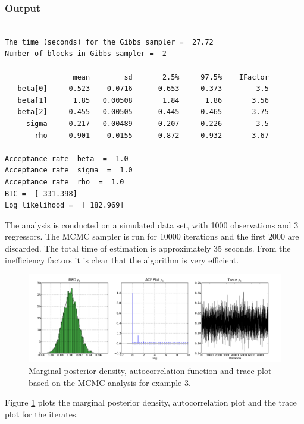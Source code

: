 \documentclass[article]{jss}
\begin{document}
\subsubsection{Output}

\begin{verbatim}

The time (seconds) for the Gibbs sampler =  27.72
Number of blocks in Gibbs sampler =  2

                mean        sd       2.5%     97.5%    IFactor
   beta[0]    -0.523    0.0716     -0.653    -0.373        3.5
   beta[1]      1.85   0.00508       1.84      1.86       3.56
   beta[2]     0.455   0.00505      0.445     0.465       3.75
     sigma     0.217   0.00489      0.207     0.226        3.5
       rho     0.901    0.0155      0.872     0.932       3.67

Acceptance rate  beta  =  1.0
Acceptance rate  sigma  =  1.0
Acceptance rate  rho  =  1.0
BIC =  [-331.398]
Log likelihood =  [ 182.969]

\end{verbatim}

The analysis is conducted on a simulated data set, with 1000
observations and 3 regressors. The MCMC sampler is run for 10000
iterations and the first 2000 are discarded. The total time of
estimation is approximately 35 seconds. From the inefficiency factors
it is clear that the algorithm is very efficient.

%
\begin{figure}[t!]
\label{Flo:AR1}
\begin{center}
  \includegraphics{rho.pdf}
\end{center}
\caption{Marginal posterior density, autocorrelation function and trace plot
based on the MCMC analysis for example 3.}

\end{figure}


Figure \ref{Flo:AR1} plots the marginal posterior density, autocorrelation
plot and the trace plot for the iterates. 
\end{document}
